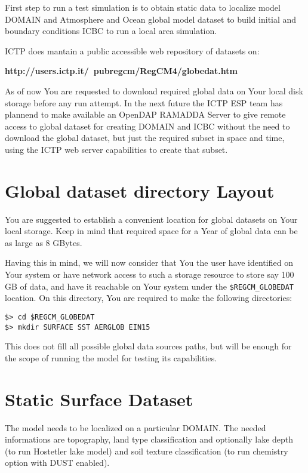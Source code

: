 %
%

First step to run a test simulation is to obtain static data to localize
model DOMAIN and Atmosphere and Ocean global model dataset to build initial
and boundary conditions ICBC to run a local area simulation.

ICTP does mantain a public accessible web repository of datasets on:

{\bf http://users.ictp.it/~pubregcm/RegCM4/globedat.htm}

As of now You are requested to download required global data on Your local disk
storage before any run attempt. In the next future the ICTP ESP team has
plannend to make available an OpenDAP RAMADDA Server to give remote access
to global dataset for creating DOMAIN and ICBC without the need to
download the global dataset, but just the required subset in space and time,
using the ICTP web server capabilities to create that subset.

\section{Global dataset directory Layout}

You are suggested to establish a convenient location for global datasets
on Your local storage. Keep in mind that required space for a Year of global
data can be as large as 8 GBytes.

Having this in mind, we will now consider that You the user have identified
on Your system or have network access to such a storage resource to store say
100 GB of data, and have it reachable on Your system under the
\verb=$REGCM_GLOBEDAT= location.
On this directory, You are required to make the following directories:

\begin{Verbatim}
$> cd $REGCM_GLOBEDAT
$> mkdir SURFACE SST AERGLOB EIN15
\end{Verbatim}

This does not fill all possible global data sources paths, but will be enough
for the scope of running the model for testing its capabilities.

\section{Static Surface Dataset}

The model needs to be localized on a particular DOMAIN. The needed informations
are topography, land type classification and optionally lake depth (to run
Hostetler lake model) and soil texture classification (to run chemistry option
with DUST enabled).

